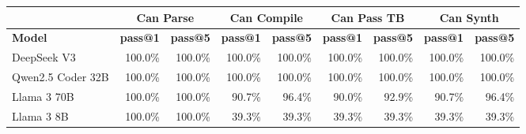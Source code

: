 \begin{tabular}{l|rr|rr|rr|rr}
\cmidrule[\heavyrulewidth]{2-9}
 & \multicolumn{2}{c|}{\textbf{Can Parse}} & \multicolumn{2}{c|}{\textbf{Can Compile}} & \multicolumn{2}{c|}{\textbf{Can Pass TB}} & \multicolumn{2}{c}{\textbf{Can Synth}} \\
\midrule
 \textbf{Model} & \textbf{pass@1} & \textbf{pass@5} & \textbf{pass@1} & \textbf{pass@5} & \textbf{pass@1} & \textbf{pass@5} & \textbf{pass@1} & \textbf{pass@5} \\
\midrule
DeepSeek V3 & 100.0\% & 100.0\% & 100.0\% & 100.0\% & 100.0\% & 100.0\% & 100.0\% & 100.0\% \\
Qwen2.5 Coder 32B & 100.0\% & 100.0\% & 100.0\% & 100.0\% & 100.0\% & 100.0\% & 100.0\% & 100.0\% \\
Llama 3 70B & 100.0\% & 100.0\% & 90.7\% & 96.4\% & 90.0\% & 92.9\% & 90.7\% & 96.4\% \\
Llama 3 8B & 100.0\% & 100.0\% & 39.3\% & 39.3\% & 39.3\% & 39.3\% & 39.3\% & 39.3\% \\
\bottomrule
\end{tabular}